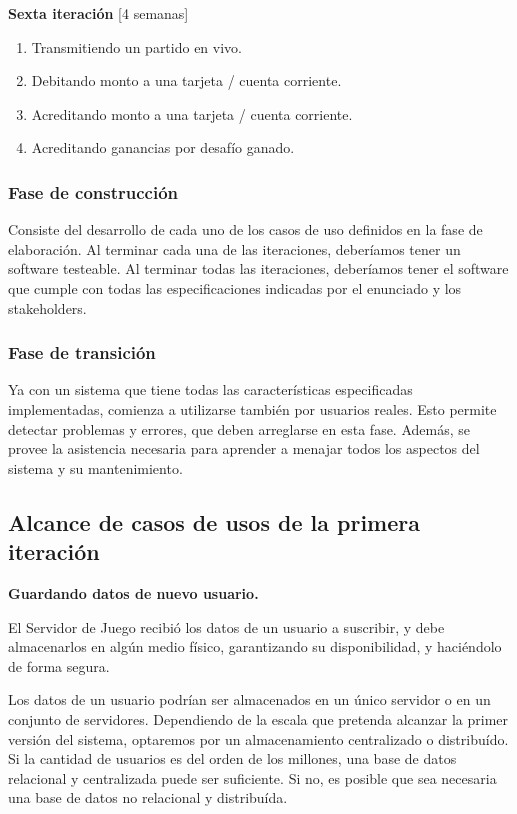 \documentclass[a4paper, 10pt, twoside]{article}
\begin{document}
\textbf{Sexta iteración} [4 semanas]
\begin{enumerate}
\item Transmitiendo un partido en vivo.
\item Debitando monto a una tarjeta / cuenta corriente.
\item Acreditando monto a una tarjeta / cuenta corriente.
\item Acreditando ganancias por desafío ganado.
\end{enumerate}

\subsubsection{Fase de construcción}

Consiste del desarrollo de cada uno de los casos de uso definidos en la fase de elaboración. Al terminar cada una de las iteraciones, deberíamos tener un software testeable. Al terminar todas las iteraciones, deberíamos tener el software que cumple con todas las especificaciones indicadas por el enunciado y los stakeholders.

\subsubsection{Fase de transición}

Ya con un sistema que tiene todas las características especificadas implementadas, comienza a utilizarse también por usuarios reales. Esto permite detectar problemas y errores, que deben arreglarse en esta fase. Además, se provee la asistencia necesaria para aprender a menajar todos los aspectos del sistema y su mantenimiento.

\subsection{Alcance de casos de usos de la primera iteración}
\textbf{Guardando datos de nuevo usuario.}

El Servidor de Juego recibió los datos de un usuario a suscribir, y debe almacenarlos en algún medio físico, garantizando su disponibilidad, y haciéndolo de forma segura.

Los datos de un usuario podrían ser almacenados en un único servidor o en un conjunto de servidores. Dependiendo de la escala que pretenda alcanzar la primer versión del sistema, optaremos por un almacenamiento centralizado o distribuído. Si la cantidad de usuarios es del orden de los millones, una base de datos relacional y centralizada puede ser suficiente. Si no, es posible que sea necesaria una base de datos no relacional y distribuída.
\end{document}
